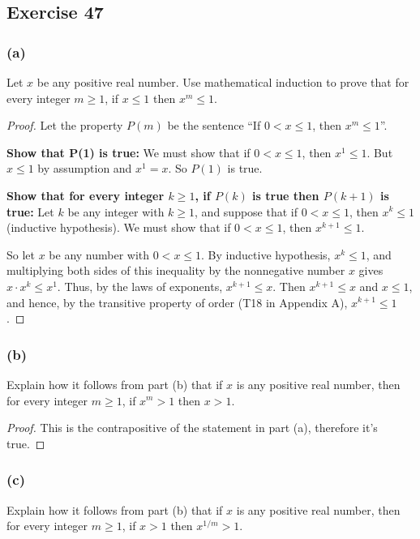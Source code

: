 \documentclass[14pt]{extarticle}
\begin{document}
\subsection{Exercise 47}
\subsubsection{(a)}
Let \(x\) be any positive real number. Use mathematical induction to prove that for every integer \(m \geq 1\), if
\(x \leq 1\) then \(x^m \leq 1\).

\begin{proof}
    Let the property \(P(m)\) be the sentence ``If \(0 < x \leq 1\), then \(x^m \leq 1\)''.

    {\bf Show that P(1) is true:} We must show that if \(0 < x \leq 1\), then \(x^1 \leq 1\). But \(x \leq 1\) by assumption
    and \(x^1 = x\). So \(P(1)\) is true.

        {\bf Show that for every integer \(k \geq 1\), if \(P(k)\) is true then \(P(k + 1)\) is true:} Let \(k\) be any integer with
    \(k \geq 1\), and suppose that if \(0 < x \leq 1\), then \(x^k \leq 1\) (inductive hypothesis). We must show that if
    \(0 < x \leq 1\), then \(x^{k+1} \leq 1\).

    So let \(x\) be any number with \(0 < x \leq 1\). By inductive hypothesis, \(x^k \leq 1\), and multiplying both sides of this
    inequality by the nonnegative number \(x\) gives \(x \cdot x^k \leq x^1\). Thus, by the laws of exponents, \(x^{k+1}\leq x\).
    Then \(x^{k+1} \leq x\) and \(x \leq 1\), and hence, by the transitive property of order (T18 in Appendix A),
    \(x^{k+1} \leq 1\).
\end{proof}

\subsubsection{(b)}
Explain how it follows from part (b) that if \(x\) is any positive real number, then for every integer \(m \geq 1\), if
\(x^m > 1\) then \(x > 1\).

\begin{proof}
    This is the contrapositive of the statement in part (a), therefore it's true.
\end{proof}

\subsubsection{(c)}
Explain how it follows from part (b) that if \(x\) is any positive real number, then for every integer \(m \geq 1\), if
\(x > 1\) then \(x^{1/m} > 1\).
\end{document}
